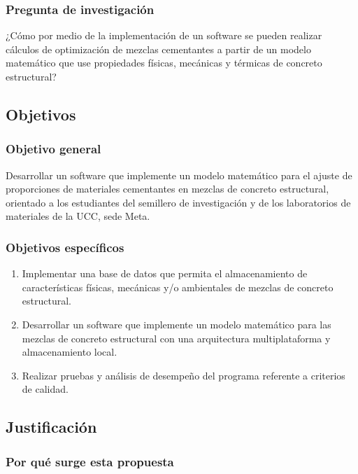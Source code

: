 \documentclass[12pt, letterpaper]{article}
\begin{document}
\subsubsection*{Pregunta de investigación}
¿Cómo por medio de la implementación de un software se pueden realizar cálculos de optimización de mezclas cementantes a partir de un modelo matemático que use propiedades físicas, mecánicas y térmicas de concreto estructural?

\subsection{Objetivos}

\subsubsection{Objetivo general}
Desarrollar un software que implemente un modelo matemático para el ajuste de proporciones de materiales cementantes en mezclas de concreto estructural, orientado a los estudiantes del semillero de investigación y de los laboratorios de materiales de la UCC, sede Meta.

\subsubsection{Objetivos específicos}
\begin{enumerate}
    \item Implementar una base de datos que permita el almacenamiento de características físicas, mecánicas y/o ambientales de mezclas de concreto estructural.
    \item Desarrollar un software que implemente un modelo matemático para las mezclas de concreto estructural con una arquitectura multiplataforma y almacenamiento local.
    \item Realizar pruebas y análisis de desempeño del programa referente a criterios de calidad.
\end{enumerate}

\subsection{Justificación}

\subsubsection*{Por qué surge esta propuesta}
\end{document}
